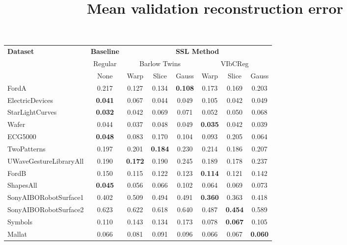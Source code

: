 \documentclass[../../thesis.tex]{subfiles}
\begin{document}
\begin{table}[H]
    \centering
    \title{Mean validation reconstruction error}
    \begin{adjustbox}{width=\textwidth}
    \begin{tabular}{lc|c|c|c|c|c|c} %
        \toprule
        \multirow{3}{*}{\textbf{Dataset}} & \multicolumn{1}{c}{\textbf{Baseline}} & \multicolumn{6}{c}{\textbf{SSL Method}} \\
                                         \cmidrule(lr){3-8}
                                          & \multicolumn{1}{c}{Regular}           & \multicolumn{3}{c}{Barlow Twins}    &  \multicolumn{3}{c}{VIbCReg} \\
                                                                                   \cmidrule(lr){3-5}                    \cmidrule(lr){6-8}
                                          &   None                                & Warp  & Slice & Gauss               & Warp & Slice & Gauss \\
                            
        \midrule
        FordA                   & 0.217 & 0.127 & 0.134 & \textbf{0.108} & 0.173 & 0.169 & 0.203 \\
        ElectricDevices         & \textbf{0.041} & 0.067 & 0.044 & 0.049 & 0.105 & 0.042 & 0.049 \\
        StarLightCurves         & \textbf{0.032} & 0.042 & 0.069 & 0.071 & 0.052 & 0.050 & 0.068 \\
        Wafer                   & 0.044 & 0.037 & 0.048 & 0.049 & \textbf{0.035} & 0.042 & 0.039 \\
        ECG5000                 & \textbf{0.048} & 0.083 & 0.170 & 0.104 & 0.093 & 0.205 & 0.064 \\
        TwoPatterns             & 0.197 & 0.201 & \textbf{0.184} & 0.230 & 0.214 & 0.186 & 0.207 \\
        UWaveGestureLibraryAll  & 0.190 & \textbf{0.172} & 0.190 & 0.245 & 0.189 & 0.178 & 0.237 \\
        FordB                   & 0.150 & 0.115 & 0.122 & 0.123 & \textbf{0.114} & 0.121 & 0.142 \\
        ShapesAll               & \textbf{0.045} & 0.056 & 0.066 & 0.102 & 0.064 & 0.069 & 0.073 \\
        SonyAIBORobotSurface1   & 0.402 & 0.509 & 0.494 & 0.491 & \textbf{0.360} & 0.363 & 0.418 \\
        SonyAIBORobotSurface2   & 0.623 & 0.622 & 0.618 & 0.640 & 0.487 & \textbf{0.454} & 0.589 \\
        Symbols                 & 0.110 & 0.143 & 0.134 & 0.173 & 0.078 & \textbf{0.067} & 0.105 \\
        Mallat                  & 0.066 & 0.081 & 0.091 & 0.096 & 0.066 & 0.067 & \textbf{0.060} \\
        \bottomrule
    \end{tabular}
    \end{adjustbox}
    \label{tab:mean_recons}
\end{table}
\end{document}
